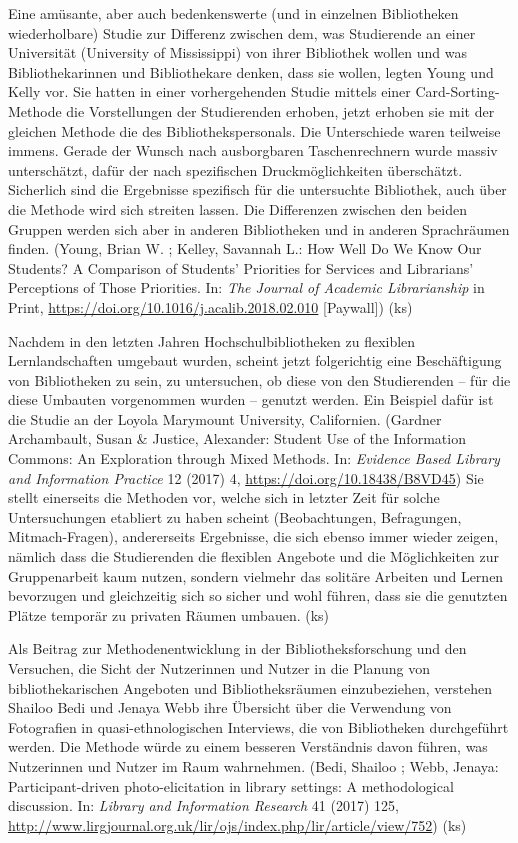 \documentclass[a4paper,
fontsize=11pt,
oneside,
numbers=noperiodatend,
parskip=half-,
bibliography=totoc,
final
]{scrartcl}
\begin{document}
Eine amüsante, aber auch bedenkenswerte (und in einzelnen Bibliotheken
wiederholbare) Studie zur Differenz zwischen dem, was Studierende an
einer Universität (University of Mississippi) von ihrer Bibliothek
wollen und was Bibliothekarinnen und Bibliothekare denken, dass sie
wollen, legten Young und Kelly vor. Sie hatten in einer vorhergehenden
Studie mittels einer Card-Sorting-Methode die Vorstellungen der
Studierenden erhoben, jetzt erhoben sie mit der gleichen Methode die des
Bibliothekspersonals. Die Unterschiede waren teilweise immens. Gerade
der Wunsch nach ausborgbaren Taschenrechnern wurde massiv unterschätzt,
dafür der nach spezifischen Druckmöglichkeiten überschätzt. Sicherlich
sind die Ergebnisse spezifisch für die untersuchte Bibliothek, auch über
die Methode wird sich streiten lassen. Die Differenzen zwischen den
beiden Gruppen werden sich aber in anderen Bibliotheken und in anderen
Sprachräumen finden. (Young, Brian W. ; Kelley, Savannah L.: How Well Do
We Know Our Students? A Comparison of Students' Priorities for Services
and Librarians' Perceptions of Those Priorities. In: \emph{The Journal
of Academic Librarianship} in Print,
\url{https://doi.org/10.1016/j.acalib.2018.02.010} {[}Paywall{]}) (ks)

Nachdem in den letzten Jahren Hochschulbibliotheken zu flexiblen
Lernlandschaften umgebaut wurden, scheint jetzt folgerichtig eine
Beschäftigung von Bibliotheken zu sein, zu untersuchen, ob diese von den
Studierenden -- für die diese Umbauten vorgenommen wurden -- genutzt
werden. Ein Beispiel dafür ist die Studie an der Loyola Marymount
University, Californien. (Gardner Archambault, Susan \& Justice,
Alexander: Student Use of the Information Commons: An Exploration
through Mixed Methods. In: \emph{Evidence Based Library and Information
Practice} 12 (2017) 4, \url{https://doi.org/10.18438/B8VD45}) Sie stellt
einerseits die Methoden vor, welche sich in letzter Zeit für solche
Untersuchungen etabliert zu haben scheint (Beobachtungen, Befragungen,
Mitmach-Fragen), andererseits Ergebnisse, die sich ebenso immer wieder
zeigen, nämlich dass die Studierenden die flexiblen Angebote und die
Möglichkeiten zur Gruppenarbeit kaum nutzen, sondern vielmehr das
solitäre Arbeiten und Lernen bevorzugen und gleichzeitig sich so sicher
und wohl führen, dass sie die genutzten Plätze temporär zu privaten
Räumen umbauen. (ks)

Als Beitrag zur Methodenentwicklung in der Bibliotheksforschung und den
Versuchen, die Sicht der Nutzerinnen und Nutzer in die Planung von
bibliothekarischen Angeboten und Bibliotheksräumen einzubeziehen,
verstehen Shailoo Bedi und Jenaya Webb ihre Übersicht über die
Verwendung von Fotografien in quasi-ethnologischen Interviews, die von
Bibliotheken durchgeführt werden. Die Methode würde zu einem besseren
Verständnis davon führen, was Nutzerinnen und Nutzer im Raum wahrnehmen.
(Bedi, Shailoo ; Webb, Jenaya: Participant-driven photo-elicitation in
library settings: A methodological discussion. In: \emph{Library and
Information Research} 41 (2017) 125,
\url{http://www.lirgjournal.org.uk/lir/ojs/index.php/lir/article/view/752})
(ks)
\end{document}
